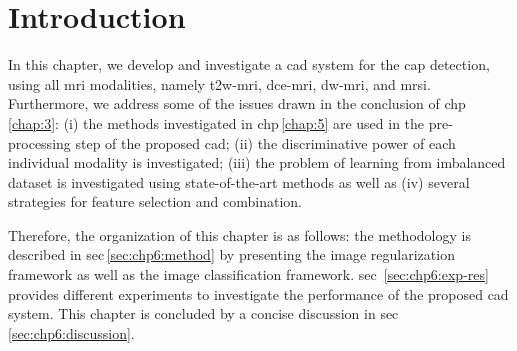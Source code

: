 \acresetall
\section{Introduction}\label{chap:6}

In this chapter, we develop and investigate a \ac{cad} system for the \ac{cap} detection, using all \ac{mri} modalities, namely \ac{t2w}-\ac{mri}, \ac{dce}-\ac{mri}, \ac{dw}-\ac{mri}, and \ac{mrsi}.
Furthermore, we address some of the issues drawn in the conclusion of \acs{chp}\,\ref{chap:3}: (i) the methods investigated in \acs{chp}\,\ref{chap:5} are used in the pre-processing step of the proposed \ac{cad}; (ii) the discriminative power of each individual modality is investigated; (iii) the problem of learning from imbalanced dataset is investigated using state-of-the-art methods as well as (iv) several strategies for feature selection and combination.

Therefore, the organization of this chapter is as follows: the methodology is described in \acs{sec}\,\ref{sec:chp6:method} by presenting the image regularization framework as well as the image classification framework. \Acl{sec}~\ref{sec:chp6:exp-res} provides different experiments to investigate the performance of the proposed \ac{cad} system. This chapter is concluded by a concise discussion in \acs{sec}\,\ref{sec:chp6:discussion}.





